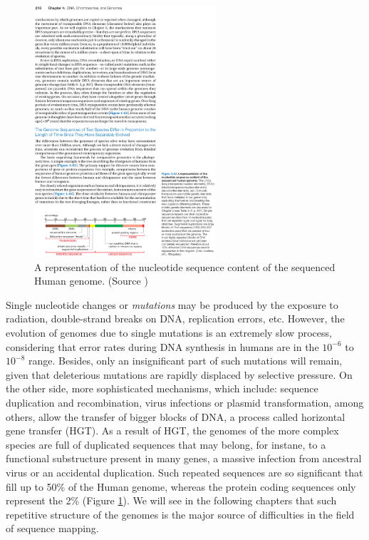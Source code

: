 \begin{figure}[h]
	\begin{minipage}[b]{\linewidth}
	  \centering
	  \includegraphics*[width=0.6\textwidth]{figures/chap1_genome_content}
	  \caption{A representation of the nucleotide sequence content of
       the sequenced Human genome. (Source \cite{})}
	  \label{fig:chap1:genome-content}
   \end{minipage}
\end{figure}

Single nucleotide changes or {\em mutations} may be produced by the
exposure to radiation, double-strand breaks on DNA, replication
errors, etc. However, the evolution of genomes due to single
mutations is an extremely slow process, considering that error rates
during DNA synthesis in humans are in the $10^{-6}$ to $10^{-8}$
range. Besides, only an insignificant part of such mutations will
remain, given that deleterious mutations are rapidly displaced by
selective pressure. On the other side, more sophisticated mechanisms,
which include: sequence duplication and recombination, virus
infections or plasmid transformation, among others, allow the transfer
of bigger blocks of DNA, a process called horizontal gene
transfer (HGT). As a result of HGT, the genomes of the more complex
species are full of duplicated sequences that may belong, for instane,
to a functional substructure present in many genes, a massive
infection from ancestral virus or an accidental duplication. Such
repeated sequences are so significant that fill up to 50\% of the
Human genome, whereas the protein coding sequences only represent the
2\% (Figure \ref{fig:chap1:genome-content}). We will see in the
following chapters that such repetitive structure of the genomes
is the major source of difficulties in the field of sequence mapping.

